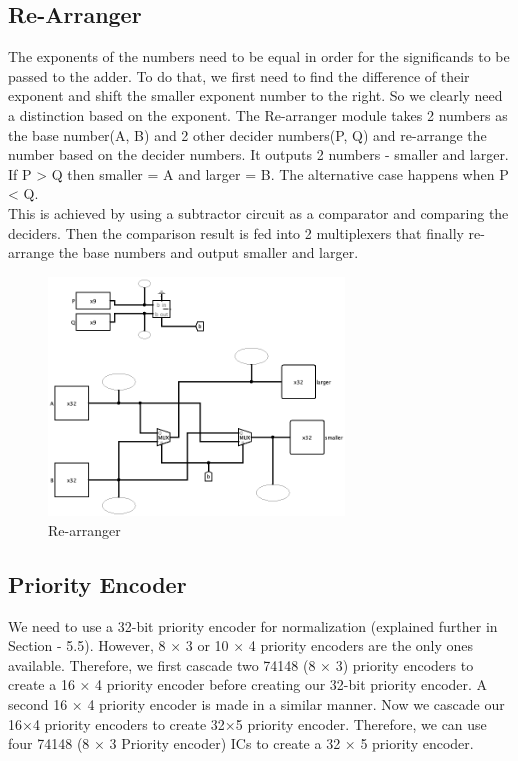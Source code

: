 \documentclass{article}
\begin{document}
\subsection{\textbf{Re-Arranger}}
The exponents of the numbers need to be equal in order for the significands to
be passed to the adder. To do that, we first need to find the difference of their
exponent and shift the smaller exponent number to the right. So we clearly
need a distinction based on the exponent. The Re-arranger module takes 2
numbers as the base number(A, B) and 2 other decider numbers(P, Q) and
re-arrange the number based on the decider numbers. It outputs 2 numbers -
smaller and larger. If P > Q then smaller = A and larger = B. The alternative
case happens when P < Q.
\\ 

This is achieved by using a subtractor circuit as a comparator and comparing
the deciders. Then the comparison result is fed into 2 multiplexers that finally
re-arrange the base numbers and output smaller and larger. 

\begin{figure}[h]
    \centering 
    \includegraphics[width = 0.7\textwidth]{rearranger}
    \caption{Re-arranger}
\end{figure}

\subsection{\textbf{Priority Encoder}}
We need to use a 32-bit priority encoder for normalization (explained further
in Section - 5.5). However, 8 × 3 or 10 × 4 priority encoders are the only ones
available. Therefore, we first cascade two 74148 (8 × 3) priority encoders to
create a 16 × 4 priority encoder before creating our 32-bit priority encoder. A
second 16 × 4 priority encoder is made in a similar manner. Now we cascade
our 16×4 priority encoders to create 32×5 priority encoder. Therefore, we can
use four 74148 (8 × 3 Priority encoder) ICs to create a 32 × 5 priority encoder.
\\ 
\\ 
\end{document}
